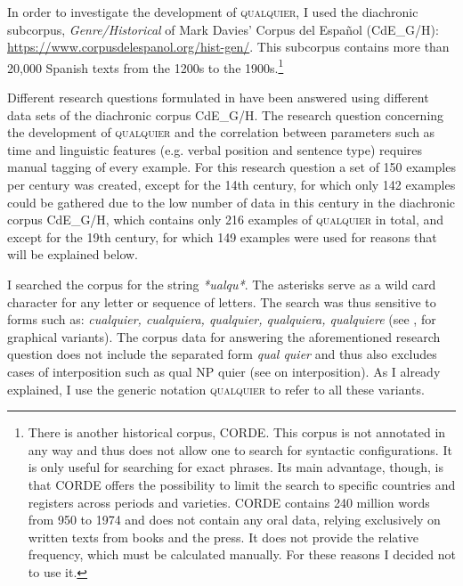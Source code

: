 In order to investigate the development of \textsc{qualquier}, I used the diachronic subcorpus, \textit{Genre/Historical} of Mark Davies’ Corpus del Español (CdE\_G/H): \url{https://www.corpusdelespanol.org/hist-gen/}. This subcorpus contains more than 20,000 Spanish texts from the 1200s to the 1900s.\footnote{{There is another historical corpus, CORDE. This corpus is not annotated in any way and thus does not allow one to search for syntactic configurations. It is only useful for searching for exact phrases. Its main advantage, though, is that CORDE offers the possibility to limit the search to specific countries and registers across periods and varieties. CORDE contains 240 million words from 950 to 1974 and does not contain any oral data, relying exclusively on written texts from books and the press. It does not provide the relative frequency, which must be calculated manually. For these reasons I decided not to use it.}}

Different research questions formulated in  have been answered using different data sets of the diachronic corpus CdE\_G/H. The research question concerning the development of \textsc{qualquier} and the correlation between parameters such as time and linguistic features (e.g. verbal position and sentence type) requires manual tagging of every example. For this research question a set of 150 examples per century was created, except for the 14th century, for which only 142 examples could be gathered due to the low number of data in this century in the diachronic corpus CdE\_G/H, which contains only 216 examples of \textsc{qualquier} in total, and except for the 19th century, for which 149 examples were used for reasons that will be explained below.

I searched the corpus for the string \textit{*ualqu*}. The asterisks serve as a wild card character for any letter or sequence of letters. The search was thus sensitive to forms such as: \textit{cualquier, cualquiera, qualquier, qualquiera, qualquiere} (see \citealt{cp2009}, \citealt{Pato2012} for graphical variants). The corpus data for answering the aforementioned research question does not include the separated form \textit{qual quier} and thus also excludes cases of interposition such as qual NP quier (see \citealt{Pato2012} on interposition). As I already explained, I use the generic notation \textsc{qualquier} to refer to all these variants.

